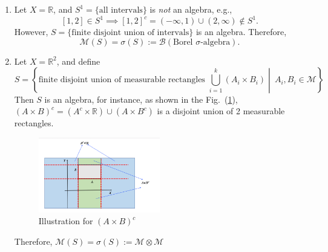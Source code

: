 \begin{example}
\begin{enumerate}
\item
Let $X=\mathbb{R}$, and $S^1=\{\text{all intervals}\}$ is \emph{not} an algebra, e.g.,
\[
[1,2]\in S^1\implies [1,2]^c = (-\infty,1)\cup(2,\infty)\notin S^1.
\]
However, $S=\{\text{finite disjoint union of intervals}\}$ is an algebra.
Therefore, \[\mathcal{M}(S)=\sigma(S):=\mathcal{B} (\text{Borel $\sigma$-algebra}).\]
\item
Let $X=\mathbb{R}^2$, and define
\[
S=
\left\{
\text{finite disjoint union of measurable rectangles }
\bigcup_{i=1}^k(A_i\times B_i)
\middle|~
A_i,B_i\in\mathcal{M}
\right\}
\]
Then $S$ is an algebra, for instance, as shown in the Fig.~(\ref{fig:13:2}), $(A\times B)^c = (A^c\times \mathbb{R})\cup(A\times B^c)$ is a disjoint union of 2 measurable rectangles.
\begin{figure}[H]
\centering
\includegraphics[width=0.5\textwidth]{week13/f_21}
\caption{Illustration for $(A\times B)^c$}
\label{fig:13:2}
\end{figure}

Therefore, $\mathcal{M}(S)=\sigma(S):=\mathcal{M}\otimes\mathcal{M}$
\end{enumerate}
\end{example}

